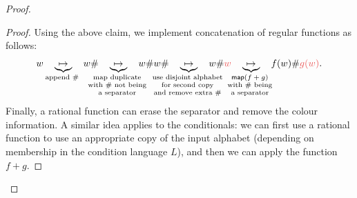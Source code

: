 \begin{proof}
\begin{proof}
        Using the above claim, we  implement concatenation of regular functions as follows:
        \begin{align*}
        w \quad \myunderbrace{\mapsto}{append $\#$}\quad  
        w\# \quad \myunderbrace{\mapsto}{map duplicate \\ with $\#$ not being \\ a separator}  \quad   w\#w\# \quad  \myunderbrace{\mapsto}{use disjoint alphabet\\ for second copy \\ and remove extra $\#$} \quad   w\#\red{w} \quad \myunderbrace{\mapsto}{$\map(f+g)$ \\ with $\#$ being \\ a separator}  \quad   f(w)\#\red{g(w)}.
        \end{align*}
        Finally, a rational function can erase the separator and remove the colour information. A similar idea applies to the conditionals: we can first use a rational function to use an appropriate copy of the input alphabet (depending on membership in the condition language $L$), and then we can apply the function $f+g$.
    \end{proof}


\end{proof}
